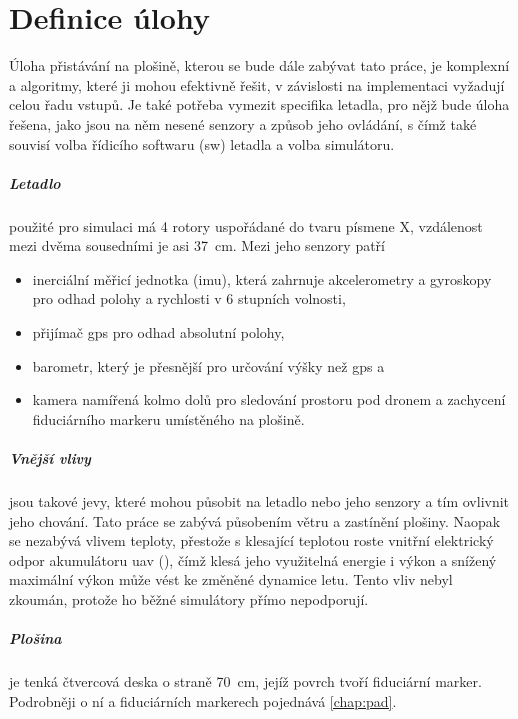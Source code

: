 \chapter{Definice úlohy} \label{chap:task}
Úloha přistávání na plošině, kterou se bude dále zabývat tato práce, je komplexní a algoritmy, které ji mohou efektivně řešit, v závislosti na implementaci vyžadují celou řadu vstupů. Je také potřeba vymezit specifika letadla, pro nějž bude úloha řešena, jako jsou na něm nesené senzory a způsob jeho ovládání, s čímž také souvisí volba řídicího softwaru (\acrshort{sw}) letadla a volba simulátoru.

\paragraph{Letadlo} použité pro simulaci má 4 rotory uspořádané do tvaru písmene X, vzdálenost mezi dvěma sousedními je asi 37~cm. Mezi jeho senzory patří \begin{itemize}
    \item inerciální měřicí jednotka (\acrshort{imu}), která zahrnuje akcelerometry a gyroskopy pro odhad polohy a rychlosti v 6 stupních volnosti, 
    \item přijímač \acrshort{gps} pro odhad absolutní polohy, 
    \item barometr, který je přesnější pro určování výšky než \acrshort{gps} a 
    \item kamera namířená kolmo dolů pro sledování prostoru pod dronem a zachycení fiduciárního markeru umístěného na plošině.
\end{itemize}

\paragraph{Vnější vlivy} jsou takové jevy, které mohou působit na letadlo nebo jeho senzory a tím ovlivnit jeho chování. Tato práce se zabývá působením větru a zastínění plošiny. Naopak se nezabývá vlivem teploty, přestože s klesající teplotou roste vnitřní elektrický odpor akumulátoru \acrshort{uav} (\cite{lipo}), čímž klesá jeho využitelná energie i výkon a snížený maximální výkon může vést ke změněné dynamice letu. Tento vliv nebyl zkoumán, protože ho běžné simulátory přímo nepodporují.

\paragraph{Plošina} je tenká čtvercová deska o straně 70~cm, jejíž povrch tvoří fiduciární marker. Podrobněji o ní a fiduciárních markerech pojednává \cref{chap:pad}.


